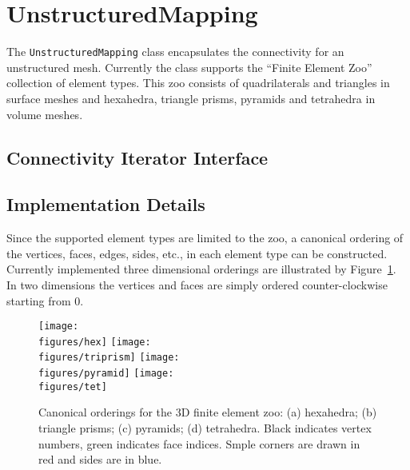 \section{UnstructuredMapping}


The {\tt UnstructuredMapping} class encapsulates the connectivity for an 
unstructured mesh.  Currently the class supports the ``Finite Element Zoo'' 
collection of element types.  This zoo consists of quadrilaterals and triangles
in surface meshes and hexahedra, triangle prisms, pyramids and tetrahedra in 
volume meshes.  

\subsection{Connectivity Iterator Interface}



\subsection{Implementation Details}
Since the supported element types are limited to the zoo, a canonical
ordering of the vertices, faces, edges, sides, etc., in each element
type can be constructed.  Currently implemented three dimensional
orderings are illustrated by Figure~\ref{fig:elementOrderings}. In two
dimensions the vertices and faces are simply ordered counter-clockwise
starting from 0.

\begin{figure} [htb] 
\centering
    \texttt{[image: \\figures/hex]}
    \texttt{[image: \\figures/triprism]}
    \texttt{[image: \\figures/pyramid]}
    \texttt{[image: \\figures/tet]}
 \caption{Canonical orderings for the 3D finite element zoo: (a) hexahedra; (b) triangle prisms; (c) pyramids; (d) tetrahedra. Black indicates vertex numbers, green indicates face indices. Smple corners are drawn in red and sides are in blue.} \label{fig:elementOrderings} 
\end{figure}

